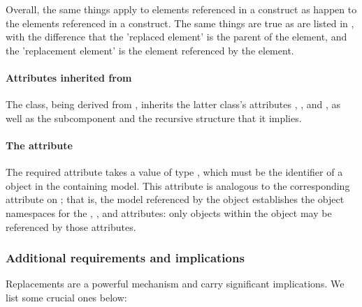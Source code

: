 Overall, the same things apply to elements referenced in a \ReplacedBy construct as happen to the elements referenced in a \ReplacedElement construct.  The same things are true as are listed in , with the difference that the 'replaced element' is the parent of the \ReplacedBy element, and the 'replacement element' is the element referenced by the \ReplacedBy element.


\paragraph{Attributes inherited from }

The \ReplacedBy class, being derived from \SBaseRef, inherits the latter class's attributes , ,  and , as well as the subcomponent  and the recursive structure that it implies.  


\paragraph{The \fixttspace{} attribute}
\label{replacedby-submodelref}

The required attribute  takes a value of type , which must be the identifier of a \Submodel object in the containing model.  This attribute is analogous to the corresponding attribute on \ReplacedElement; that is, the model referenced by the \Submodel object establishes the object namespaces for the , ,  and  attributes: only objects within the \Model object may be referenced by those attributes.


\subsubsection{Additional requirements and implications}
\label{replacedelement-additional}

Replacements are a powerful mechanism and carry significant implications.  We list some crucial ones below:

